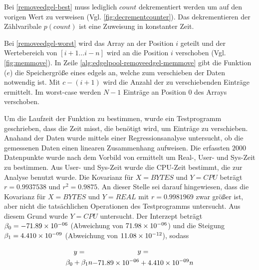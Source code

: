 Bei \ref{removeedgel-best} muss lediglich $\mathit{count}$ dekrementiert werden um auf den vorigen Wert zu verweisen
 (Vgl. \autoref{fig:decrementcounter}). Das dekrementieren der Zählvaribale $p(\mathit{count})$ ist eine Zuweisung in
 konstanter Zeit. %

Bei \autoref{removeedgel-worst} wird das Array an der Position $i$ geteilt und der Wertebereich von $[i+1 \dotsc i-n]$
 wird an die Position $i$ verschoben (Vgl. \autoref{fig:memmove}). %
In Zeile \autoref{alg:edgelpool-removeedgel-memmove} gibt die Funktion ($e$) die Speichergröße eines
 \gls{edgels} an, welche zum verschieben der Daten notwendig ist. Mit $c - (i + 1)$ wird die Anzahl der zu
 verschiebenden Einträge ermittelt. Im worst-case werden $N-1$ Einträge an Position $0$ des Arrays verschoben.

Um die Laufzeit der Funktion  zu bestimmen, wurde ein Testprogramm geschrieben, dass die Zeit misst,
 die benötigt wird, um Einträge zu verschieben. Anahand der Daten wurde mittels einer Regressionsanalyse untersucht, ob
 die gemessenen Daten einen linearen Zusammenhang aufweisen. Die erfassten $2000$ Datenpunkte wurde nach dem Vorbild von
ermittelt um Real-, User- und Sys-Zeit zu bestimmen. Aus User- und Sys-Zeit wurde die CPU-Zeit bestimmt, die zur
 Analyse benutzt wurde. Die Kovarianz für $X = \mathit{BYTES}$ und $Y = \mathit{CPU}$ beträgt $r = 0.9937538$ und
 $r^2 = 0.9875$. An dieser Stelle sei darauf hingewiesen, dass die Kovarianz für $X = \mathit{BYTES}$ und
 $Y = \mathit{REAL}$ mit $r = 0.9981969$ zwar größer ist, aber nicht die tatsächlichen Operationen des Testprogramms
 untersucht. Aus diesem Grund wurde $Y = \mathit{CPU}$ untersucht. Der Interzept beträgt $\beta_0 = -71.89\times 10^{-06}$
 (Abweichung von $71.98\times 10^{-06}$) und die Steigung $\beta_1 = 4.410\times 10^{-09}$ (Abweichung von $11.08\times 10^{-12}$), sodass

\begin{subequations}
\begin{multline}
	y =\\ \beta_0 + \beta_1n
\end{multline}
\begin{multline}
	y =\\ -71.89\e{-06} + 4.410\e{-09}n
\end{multline}
\end{subequations} %

